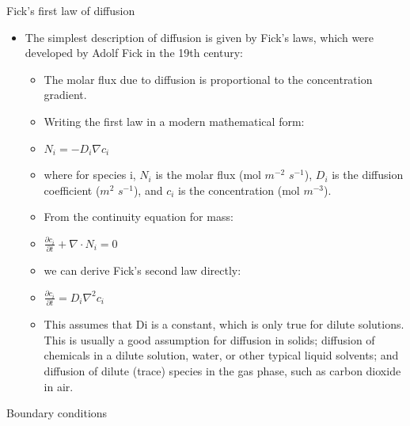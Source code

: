 \documentclass{beamer}
\begin{document}
\begin{frame}{Fick's first law of diffusion}
    \begin{center}
    \begin{itemize}
        \item The simplest description of diffusion is given by Fick's laws, which were developed by Adolf Fick in the 19th century:
        \begin{itemize}
            \item The molar flux due to diffusion is proportional to the concentration gradient.
            \item Writing the first law in a modern mathematical form:
            \item $N_i = -D_i \nabla c_i$
            \item where for species i, $N_i$ is the molar flux (mol $m^{-2}$ $s^{-1}$), $D_i$ is the diffusion coefficient ($m^2$ $s^{-1}$), and $c_i$ is the concentration (mol $m^{-3}$).

            \item From the continuity equation for mass:
            \item $\frac{\partial c_i}{\partial t}+\nabla \cdot N_i =0$
            \item we can derive Fick's second law directly:
            \item $\frac{\partial c_i}{\partial t} = D_i \nabla^2 c_i$
            \item This assumes that Di is a constant, which is only true for dilute solutions. This is usually a good assumption for diffusion in solids; diffusion of chemicals in a dilute solution, water, or other typical liquid solvents; and diffusion of dilute (trace) species in the gas phase, such as carbon dioxide in air.
        \end{itemize}
    \end{itemize}
        
    \end{center}
\end{frame}

\begin{frame}{}
    \begin{center}
        Boundary conditions
        
    \end{center}
\end{frame}
\end{document}
